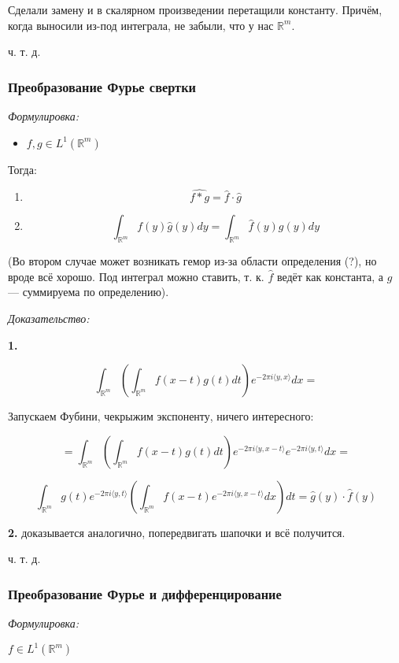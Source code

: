 \documentclass{article}
\def\sk#1#2{\langle #1, #2 \rangle}
\begin{document}
Сделали замену и в скалярном произведении перетащили константу. Причём, когда выносили из-под интеграла, не забыли, что у нас $\mathbb{R}^m$.

ч. т. д.

\subsubsection{Преобразование Фурье свертки}
\textit{Формулировка:}

\begin{itemize}
    \item $f, g \in L^1(\mathbb{R}^m)$
\end{itemize}

Тогда:

\begin{enumerate}
    \item \[\widehat{f * g} = \hat{f}\cdot \hat{g}\]
    \item \[\int_{\mathbb{R}^m} f(y) \hat{g}(y) dy = \int_{\mathbb{R}^m} \hat{f}(y) g(y) dy\]
\end{enumerate}

(Во втором случае может возникать гемор из-за области определения (?), но вроде всё хорошо. Под интеграл можно ставить, т. к. $\hat{f}$ ведёт как константа, а $g$ --- суммируема по определению).

\textit{Доказательство:}

\textbf{1.}

\[\int_{\mathbb{R}^m} \left(\int_{\mathbb{R}^m} f(x - t)g(t) dt\right) e^{-2 \pi i \sk{y}{x}}dx =\]

Запускаем Фубини, чекрыжим экспоненту, ничего интересного:

\[ = \int_{\mathbb{R}^m} \left(\int_{\mathbb{R}^m} f(x - t)g(t) dt\right) e^{-2 \pi i \sk{y}{x - t}} e^{-2\pi i \sk{y}{t}}dx =\]

\[\int_{\mathbb{R}^m}g(t)e^{-2 \pi i \sk{y}{t}} \left( \int_{\mathbb{R}^m} f(x - t) e^{-2\pi i \sk{y}{x - t}} dx \right) dt = \hat{g}(y) \cdot \hat{f}(y)\]

\textbf{2. } доказывается аналогично, попередвигать шапочки и всё получится.

ч. т. д. 


\subsubsection{Преобразование Фурье и дифференцирование}
\textit{Формулировка:}

$f \in L^1(\mathbb{R}^m)$
\end{document}
